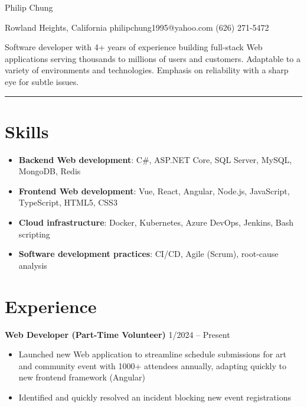 \documentclass[12pt]{article}
\newcommand{\primaryheader}[4]{
	\textbf{#1}
	\ifthenelse{\equal{#3}{}}{}{%
		\symbol{"B7} #3 \ifthenelse{\equal{#4}{}}{}{(#4)}
	}
	\hfill #2%
}
\begin{document}
	\begin{center}
		{\headerfont\fontsize{24pt}{24pt}\selectfont Philip Chung}

		\vspace{0.5em}

		Rowland Heights, California  philipchung1995@yahoo.com  (626) 271-5472
	\end{center}

	\vspace{-0.5em}

	{\fontsize{10pt}{12pt}\selectfont

		Software developer with 4+ years of experience building full-stack Web applications serving thousands to millions of users and customers. Adaptable to a variety of environments and technologies. Emphasis on reliability with a sharp eye for subtle issues.

	}

	\rule{\textwidth}{1pt}

	\section*{Skills}

	\newcommand{\skillitem}[2]{\item \textbf{#1}: #2}

	\begin{itemize}[left=0.25in .. 0.25in,label={},itemindent=-0.25in]
		\skillitem{Backend Web development}{C\#, ASP.NET Core, SQL Server, MySQL, MongoDB, Redis}
		\skillitem{Frontend Web development}{Vue, React, Angular, Node.js, JavaScript, TypeScript, HTML5, CSS3}
		\skillitem{Cloud infrastructure}{Docker, Kubernetes, Azure DevOps, Jenkins, Bash scripting}
		\skillitem{Software development practices}{CI/CD, Agile (Scrum), root-cause analysis}
	\end{itemize}

	\section*{Experience}

	\primaryheader{Web Developer (Part-Time Volunteer)}{1/2024 -- Present}{PNW}{Remote}

	\begin{itemize}
		\item Launched new Web application to streamline schedule submissions for art and community event with 1000+ attendees annually, adapting quickly to new frontend framework (Angular)
		\item Identified and quickly resolved an incident blocking new event registrations
	\end{itemize}
\end{document}
